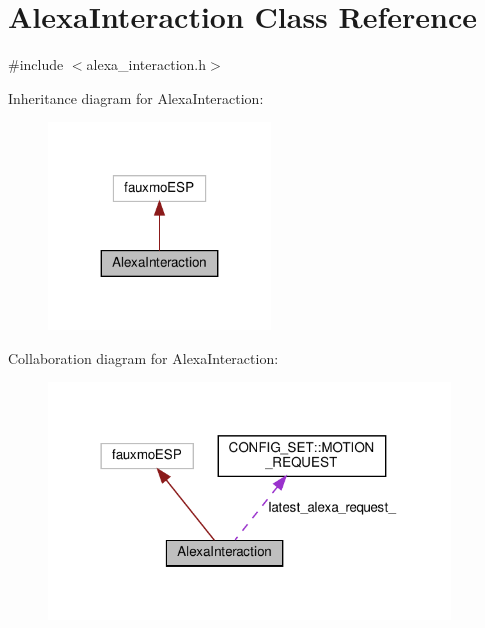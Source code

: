 \hypertarget{classAlexaInteraction}{}\section{Alexa\+Interaction Class Reference}
\label{classAlexaInteraction}


{\ttfamily \#include $<$alexa\+\_\+interaction.\+h$>$}



Inheritance diagram for Alexa\+Interaction\+:
\nopagebreak
\begin{figure}[H]
\begin{center}
\leavevmode
\includegraphics[width=167pt]{classAlexaInteraction__inherit__graph}
\end{center}
\end{figure}


Collaboration diagram for Alexa\+Interaction\+:
\nopagebreak
\begin{figure}[H]
\begin{center}
\leavevmode
\includegraphics[width=302pt]{classAlexaInteraction__coll__graph}
\end{center}
\end{figure}
